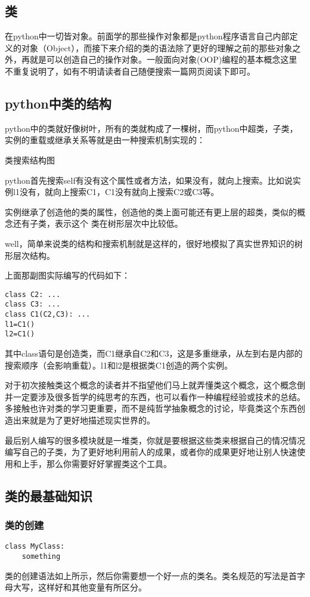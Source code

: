 \documentclass[12pt,oneside]{book}
\begin{document}
\begin{common-format}
\chapter{类}
在python中一切皆对象。前面学的那些操作对象都是python程序语言自己内部定义的对象（Object），而接下来介绍的类的语法除了更好的理解之前的那些对象之外，再就是可以创造自己的操作对象。一般面向对象(OOP)编程的基本概念这里不重复说明了，如有不明请读者自己随便搜索一篇网页阅读下即可。

\section{python中类的结构}
python中的类就好像树叶，所有的类就构成了一棵树，而python中超类，子类，实例的重载或继承关系等就是由一种搜索机制实现的：
\begin{fig}{类搜索结构图}
\label{fig:类搜索结构图}
\end{fig}
python首先搜索self有没有这个属性或者方法，如果没有，就向上搜索。比如说实例l1没有，就向上搜索C1，C1没有就向上搜索C2或C3等。

实例继承了创造他的类的属性，创造他的类上面可能还有更上层的超类，类似的概念还有子类，表示这个 类在树形层次中比较低。

well，简单来说类的结构和搜索机制就是这样的，很好地模拟了真实世界知识的树形层次结构。

上面那副图实际编写的代码如下：
\begin{Verbatim}
class C2: ...
class C3: ...
class C1(C2,C3): ...
l1=C1()
l2=C1()
\end{Verbatim}
其中class语句是创造类，而C1继承自C2和C3，这是多重继承，从左到右是内部的搜索顺序（会影响重载）。l1和l2是根据类C1创造的两个实例。

对于初次接触类这个概念的读者并不指望他们马上就弄懂类这个概念，这个概念倒并一定要涉及很多哲学的纯思考的东西，也可以看作一种编程经验或技术的总结。多接触也许对类的学习更重要，而不是纯哲学抽象概念的讨论，毕竟类这个东西创造出来就是为了更好地描述现实世界的。

最后别人编写的很多模块就是一堆类，你就是要根据这些类来根据自己的情况情况编写自己的子类，为了更好地利用前人的成果，或者你的成果更好地让别人快速使用和上手，那么你需要好好掌握类这个工具。

\section{类的最基础知识}
\subsection{类的创建}
\begin{Verbatim}
class MyClass:
    something
\end{Verbatim}
类的创建语法如上所示，然后你需要想一个好一点的类名。类名规范的写法是首字母大写，这样好和其他变量有所区分。


\end{common-format}
\end{document}
